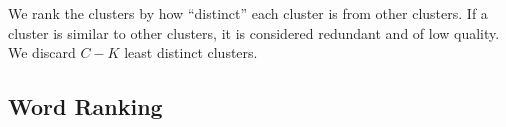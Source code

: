 \documentclass[10pt,final,conference,letterpaper]{IEEEtran}
\begin{document}
We rank the clusters by how ``distinct'' each cluster is from other clusters. 
If a cluster is similar to other clusters, it is considered redundant and of
low quality. We discard $C-K$ least distinct clusters.


%
%
%
\subsection{Word Ranking}
\label{sec:word_ranking}
\end{document}
